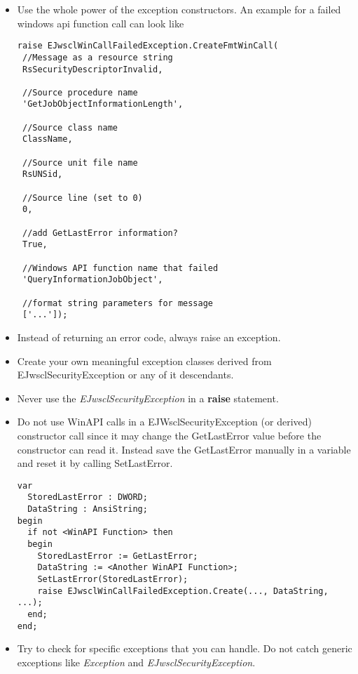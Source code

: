\documentclass[a4paper,oneside,10pt]{article}
\begin{document}
\begin{itemize}
	\item Use the whole power of the exception constructors. An example for a failed windows api function call can look like
\begin{lstlisting}
raise EJwsclWinCallFailedException.CreateFmtWinCall(
 //Message as a resource string
 RsSecurityDescriptorInvalid,          
 
 //Source procedure name
 'GetJobObjectInformationLength',      
 
 //Source class name
 ClassName,                            
 
 //Source unit file name
 RsUNSid,                              
 
 //Source line (set to 0)
 0,                                    
 
 //add GetLastError information?
 True,                                 
 
 //Windows API function name that failed
 'QueryInformationJobObject',          
 
 //format string parameters for message
 ['...']);
\end{lstlisting}            
  \item Instead of returning an error code, always raise an exception.
  \item Create your own meaningful exception classes derived from EJwsclSecurityException or any of it descendants.
  \item Never use the \textit{EJwsclSecurityException} in a \textbf{raise} statement.
  \item Do not use WinAPI calls in a EJWsclSecurityException (or derived) constructor call since it may change the GetLastError value before the constructor can read it. Instead save the GetLastError manually in a variable and reset it by calling SetLastError.
\begin{lstlisting}  
var 
  StoredLastError : DWORD;
  DataString : AnsiString;
begin
  if not <WinAPI Function> then
  begin
    StoredLastError := GetLastError;
    DataString := <Another WinAPI Function>;
    SetLastError(StoredLastError);
    raise EJwsclWinCallFailedException.Create(..., DataString, ...);
  end;
end;
\end{lstlisting}

  \item Try to check for specific exceptions that you can handle. Do not catch generic
exceptions like \textit{Exception} and \textit{EJwsclSecurityException}.

\end{itemize}
\end{document}
